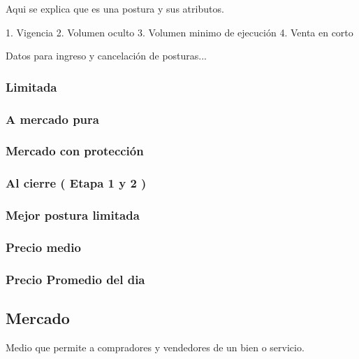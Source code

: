             Aqui se explica que es una postura y sus atributos. 
            
                1. Vigencia 
                2. Volumen oculto
                3. Volumen minimo de ejecución
                4. Venta en corto
                
            Datos para ingreso y cancelación de posturas...
                
            \subsubsection{ Limitada }
            
            \subsubsection{ A mercado pura }
            
            \subsubsection{ Mercado con protecci\'on }
            
            \subsubsection{ Al cierre ( Etapa 1 y 2 ) }
            
            \subsubsection{ Mejor postura limitada }
            
            \subsubsection{ Precio medio }
            
            \subsubsection{ Precio Promedio del dia }
                
       \subsection{ Mercado }
        
        Medio que permite a compradores y vendedores de un bien o servicio.
        
